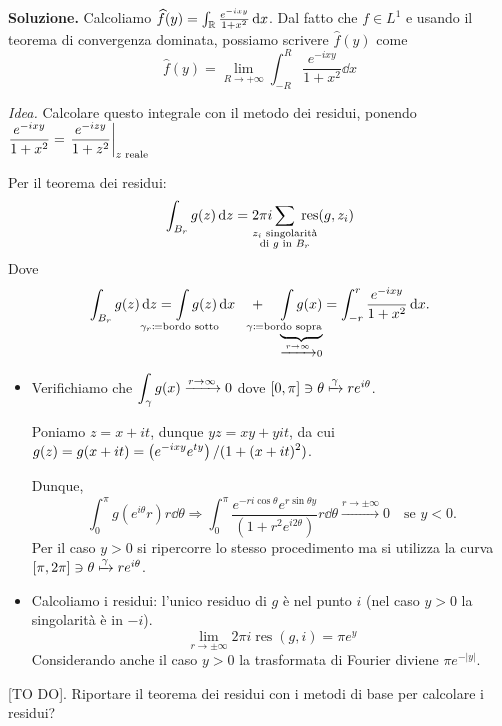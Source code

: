 \textbf{Soluzione.}
Calcoliamo $\widehat{f}(y) = \int_\mathbb R \frac{e^{-ixy}}{1 + x^2} \,\mathrm{d} x$.
Dal fatto che $f \in L^1$ e usando il teorema di convergenza dominata, possiamo scrivere $\hat{f}(y)$ come
%
$$
	\hat{f}(y) = \lim_{R \to +\infty} \int_{-R}^R \frac{e^{-ixy}}{1 + x^2} \dd x
$$
%

\textit{Idea.} Calcolare questo integrale con il metodo dei residui, ponendo $\displaystyle \frac{e^{-ixy}}{1 + x^2} = \left. \frac{e^{-izy}}{1 + z^2} \right|_{z \text{ reale}}$

Per il teorema dei residui:
%
$$
	\int_{B_r} g(z) \dd z = 2\pi i \sum_{\mathclap{\substack{z_i \text{ singolarità} \\ \text{di } g \text{ in } B_r}}} \; \operatorname{res} (g,z_i) 
$$
%
Dove
%
$$
	\int_{B_r} g(z) \dd z = \int\limits_{\mathclap{\gamma_r \coloneqq \text{bordo  sotto}}} g(z) \dd x \quad 
	+ \quad \underbrace{\int\limits_{\mathclap{\gamma \coloneqq \text{bordo sopra}}} g(x)}_{\xrightarrow{r \to \infty} 0}
	= \int_{-r}^{r} \frac{e^{-ixy}}{1 + x^2} \dd x.
$$
%

\begin{itemize}

	\item Verifichiamo che $\displaystyle \int_{\gamma} g(x) \xrightarrow{r \to \infty} 0$ dove $[0,\pi] \ni \theta \xmapsto{\gamma} r e^{i\theta}$.

	Poniamo $z = x + it$, dunque $yz = xy + yit$, da cui $\displaystyle g(z) = g(x + it) = \left( e^{-ixy} e^{ty} \right) / (1 + (x + it)^2)$.

	Dunque,
	$$
		\int_0^\pi g(e^{i\theta}r) r \dd \theta
		\Longrightarrow \int_0^\pi \frac{e^{-ri\cos \theta} e^{r \sin\theta y}}{(1 + r^2 e^{i2\theta})} r \dd \theta
		\xrightarrow{r \to \pm \infty} 0 \quad \text{se } y < 0. 
	$$
	Per il caso $y > 0$ si ripercorre lo stesso procedimento ma si utilizza la curva $[\pi,2\pi] \ni \theta \xmapsto{\gamma} r e^{i\theta}$.


	\item Calcoliamo i residui: l'unico residuo di $g$ è nel punto $i$ (nel caso $y > 0$ la singolarità è in $-i$).
	$$
		\lim_{r \to \pm \infty} 2\pi i \operatorname{res}(g,i) = \pi e^{y}
	$$
	Considerando anche il caso $y > 0$ la trasformata di Fourier diviene $\pi e^{-|y|}$.

\end{itemize}

[TO DO]. Riportare il teorema dei residui con i metodi di base per calcolare i residui?

